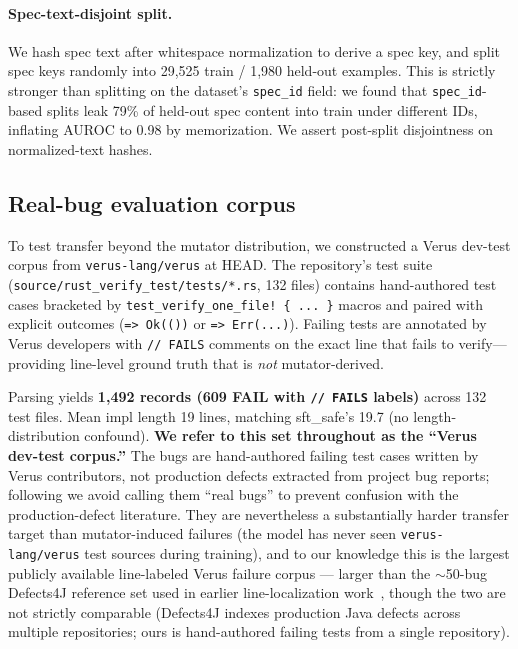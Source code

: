 \documentclass[10pt]{article}
\begin{document}
\paragraph{Spec-text-disjoint split.}
We hash spec text after whitespace normalization to derive a spec key, and
split spec keys randomly into 29{,}525 train / 1{,}980 held-out examples.
This is strictly stronger than splitting on the dataset's \texttt{spec\_id}
field: we found that \texttt{spec\_id}-based splits leak 79\% of held-out
spec content into train under different IDs, inflating AUROC to 0.98 by
memorization. We assert post-split disjointness on normalized-text hashes.

\subsection{Real-bug evaluation corpus}
\label{sec:methods:real-bug}
To test transfer beyond the mutator distribution, we constructed a Verus dev-test
corpus from \texttt{verus-lang/verus} at HEAD. The repository's test suite
(\texttt{source/rust\_verify\_test/tests/*.rs}, 132 files) contains
hand-authored test cases bracketed by
\texttt{test\_verify\_one\_file! \{ ... \}} macros and paired with explicit
outcomes (\texttt{=> Ok(())} or \texttt{=> Err(...)}). Failing tests are
annotated by Verus developers with \texttt{// FAILS} comments on the exact
line that fails to verify---providing line-level ground truth that is
\emph{not} mutator-derived.

Parsing yields \textbf{1{,}492 records (609 FAIL with \texttt{// FAILS}
labels)} across 132 test files. Mean impl length 19 lines, matching
sft\_safe's 19.7 (no length-distribution confound). \textbf{We refer to
this set throughout as the ``Verus dev-test corpus.''} The bugs are
hand-authored failing test cases written by Verus contributors, not
production defects extracted from project bug reports; following
\cite{just2014mutants} we avoid calling them ``real bugs'' to prevent
confusion with the production-defect literature. They are nevertheless
a substantially harder transfer target than mutator-induced failures
(the model has never seen \texttt{verus-lang/verus} test sources during
training), and to our knowledge this is the largest publicly available
line-labeled Verus failure corpus --- larger than the $\sim$50-bug
Defects4J reference set used in earlier line-localization
work~\cite{just2014mutants}, though the two are not strictly comparable
(Defects4J indexes production Java defects across multiple repositories;
ours is hand-authored failing tests from a single repository).
\end{document}
